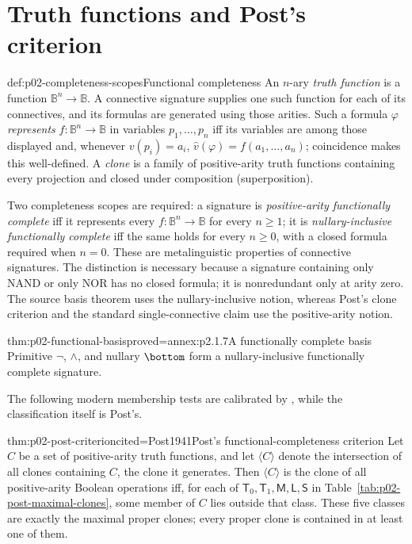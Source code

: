 \section{Truth functions and Post's criterion}
\label{sec:p02-functional-completeness}

\begin{hbdefinition}{def:p02-completeness-scopes}{Functional completeness}
An \(n\)-ary \emph{truth function} is a function
\(\mathbb B^n\to\mathbb B\).  A connective signature supplies one such
function for each of its connectives, and its formulas are generated using
those arities.  Such a formula \(\varphi\) \emph{represents}
\(f:\mathbb B^n\to\mathbb B\) in variables \(p_1,\ldots,p_n\) iff its
variables are among those displayed and, whenever \(v(p_i)=a_i\),
\(\widehat v(\varphi)=f(a_1,\ldots,a_n)\); coincidence makes this
well-defined.  A \emph{clone} is a family of
positive-arity truth functions containing every projection and closed under
composition (superposition).

Two completeness scopes are required: a signature is
\emph{positive-arity functionally complete} iff it represents every
\(f:\mathbb B^n\to\mathbb B\) for every \(n\geq1\); it is
\emph{nullary-inclusive functionally complete} iff the same holds for every
\(n\geq0\), with a closed formula required when \(n=0\).  These are
metalinguistic properties of connective signatures.  The distinction is
necessary because a signature containing only NAND or only NOR has no closed
formula; it is nonredundant only at arity zero.  The source basis theorem uses
the nullary-inclusive notion, whereas Post's clone criterion and the standard
single-connective claim use the positive-arity notion.
\end{hbdefinition}

\begin{hbtheorem}{thm:p02-functional-basis}{proved=annex:p2.1.7}{A functionally complete basis}
Primitive \(\neg\), \(\land\), and nullary \(\bottom\) form a
nullary-inclusive functionally complete signature.
\end{hbtheorem}

The following modern membership tests are calibrated by
\cite{PelletierMartin1990}, while the classification itself is Post's.

\begin{hbtheorem}{thm:p02-post-criterion}{cited=Post1941}{Post's functional-completeness criterion}
Let \(C\) be a set of positive-arity truth functions, and let
\(\langle C\rangle\) denote the intersection of all clones containing
\(C\), the clone it generates.  Then
\(\langle C\rangle\) is the clone of all positive-arity Boolean operations
iff, for each of
\(\mathsf T_0,\mathsf T_1,\mathsf M,\mathsf L,\mathsf S\) in
Table~\ref{tab:p02-post-maximal-clones}, some member of \(C\) lies outside
that class.  These five classes are exactly the maximal proper clones; every
proper clone is contained in at least one of them.
\end{hbtheorem}

